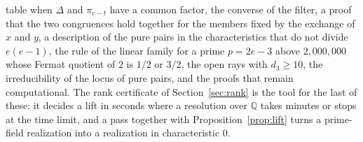 \documentclass[11pt]{article}
\theoremstyle{definition}
\theoremstyle{remark}
\newcommand{\Q}{\mathbb{Q}}
\begin{document}
table when $\Delta$ and $\pi_{e-t}$ have a common factor, the converse of the filter, a proof that the two congruences hold together for the members fixed by the exchange of $x$ and $y$, a description of the pure pairs in the characteristics that do not divide $e(e-1)$, the rule of the linear family for a prime $p=2e-3$ above $2{,}000{,}000$ whose Fermat quotient of $2$ is $1/2$ or $3/2$, the open rays with $d_3\ge10$, the irreducibility of the locus of pure pairs, and the proofs that remain computational. The rank certificate of Section~\ref{sec:rank} is the tool for the last of these: it decides a lift in seconds where a resolution over $\Q$ takes minutes or stops at the time limit, and a pass together with Proposition~\ref{prop:lift} turns a prime-field realization into a realization in characteristic $0$.


\begingroup\raggedright
\end{document}
